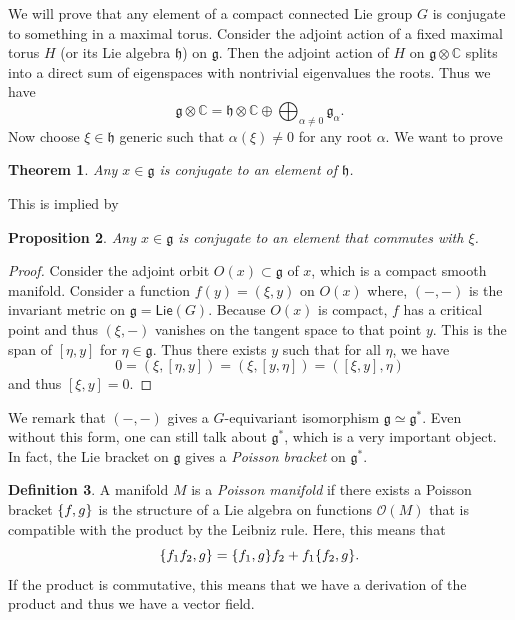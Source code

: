 \documentclass[leqno, openany]{memoir}
\newtheorem{thm}{Theorem}[section]
\newtheorem{prop}[thm]{Proposition}
\theoremstyle{definition}
\newtheorem{defn}[thm]{Definition}
\theoremstyle{remark}
\theoremstyle{plain}
\theoremstyle{definition}
\theoremstyle{remark}
\newcommand{\C}{\mathbb{C}}
\newcommand{\mc}[1]{\mathcal{#1}}
\newcommand{\mf}[1]{\mathfrak{#1}}
\newcommand{\ms}[1]{\mathsf{#1}}
\begin{document}
We will prove that any element of a compact connected Lie group $G$ is conjugate to something in a maximal torus. Consider the adjoint action of a fixed maximal torus $H$ (or its Lie algebra $\mf{h}$) on $\mf{g}$. Then the adjoint action of $H$ on $\mf{g} \otimes \C$ splits into a direct sum of eigenspaces with nontrivial eigenvalues the roots. Thus we have
\[ \mf{g} \otimes \C = \mf{h} \otimes \C \oplus \bigoplus_{\alpha \neq 0 } \mf{g}_{\alpha}. \]
Now choose $\xi \in \mf{h}$ generic such that $\alpha(\xi) \neq 0$ for any root $\alpha$. We want to prove

\begin{thm}
    Any $x \in \mf{g}$ is conjugate to an element of $\mf{h}$.
\end{thm}

This is implied by

\begin{prop}
    Any $x \in \mf{g}$ is conjugate to an element that commutes with $\xi$.
\end{prop}

\begin{proof}
    Consider the adjoint orbit $O(x) \subset \mf{g}$ of $x$, which is a compact smooth manifold. Consider a function $f(y) = (\xi, y)$ on $O(x)$ where, $(-,-)$ is the invariant metric on $\mf{g} = \ms{Lie}(G)$. Because $O(x)$ is compact, $f$ has a critical point and thus $(\xi, -)$ vanishes on the tangent space to that point $y$. This is the span of $[\eta, y]$ for $\eta \in \mf{g}$. Thus there exists $y$ such that for all $\eta$, we have 
    \[ 0 = (\xi, [\eta, y]) = (\xi, [y, \eta]) = ([\xi, y], \eta) \]
    and thus $[\xi, y] = 0$.
\end{proof}

We remark that $(-,-)$ gives a $G$-equivariant isomorphism $\mf{g} \simeq \mf{g}^*$. Even without this form, one can still talk about $\mf{g}^*$, which is a very important object. In fact, the Lie bracket on $\mf{g}$ gives a \textit{Poisson bracket} on $\mf{g}^*$.

\begin{defn}
    A manifold $M$ is a \textit{Poisson manifold} if there exists a Poisson bracket $\qty{f, g}$ is the structure of a Lie algebra on functions $\mc{O}(M)$ that is compatible with the product by the Leibniz rule. Here, this means that
    \[ \qty{f_1 f_2, g} = \qty{f_1, g} f_2 + f_1 \qty{f_2, g}. \]
    If the product is commutative, this means that we have a derivation of the product and thus we have a vector field.
\end{defn}
\end{document}
